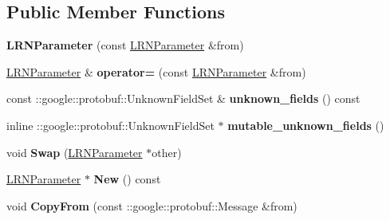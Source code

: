 \subsection*{Public Member Functions}
\begin{DoxyCompactItemize}
\item 
\mbox{\label{classcaffe_1_1_l_r_n_parameter_a51228f8492576cc55ba96e8d19580a26}} 
{\bfseries L\+R\+N\+Parameter} (const \mbox{\hyperlink{classcaffe_1_1_l_r_n_parameter}{L\+R\+N\+Parameter}} \&from)
\item 
\mbox{\label{classcaffe_1_1_l_r_n_parameter_a7126b3d84c9faa653de8981fde98efd2}} 
\mbox{\hyperlink{classcaffe_1_1_l_r_n_parameter}{L\+R\+N\+Parameter}} \& {\bfseries operator=} (const \mbox{\hyperlink{classcaffe_1_1_l_r_n_parameter}{L\+R\+N\+Parameter}} \&from)
\item 
\mbox{\label{classcaffe_1_1_l_r_n_parameter_ac3ba7bac658ae91ea55fa643793effae}} 
const \+::google\+::protobuf\+::\+Unknown\+Field\+Set \& {\bfseries unknown\+\_\+fields} () const
\item 
\mbox{\label{classcaffe_1_1_l_r_n_parameter_a92ad76febb07f8deb47ae706354a661b}} 
inline \+::google\+::protobuf\+::\+Unknown\+Field\+Set $\ast$ {\bfseries mutable\+\_\+unknown\+\_\+fields} ()
\item 
\mbox{\label{classcaffe_1_1_l_r_n_parameter_af36f6e9ee5492cecb4d5256ed03058fa}} 
void {\bfseries Swap} (\mbox{\hyperlink{classcaffe_1_1_l_r_n_parameter}{L\+R\+N\+Parameter}} $\ast$other)
\item 
\mbox{\label{classcaffe_1_1_l_r_n_parameter_a331707ac867aa8a7f6bf6cae775cdce8}} 
\mbox{\hyperlink{classcaffe_1_1_l_r_n_parameter}{L\+R\+N\+Parameter}} $\ast$ {\bfseries New} () const
\item 
\mbox{\label{classcaffe_1_1_l_r_n_parameter_ad26b983fe4d4aaf8e3389cb8b1237542}} 
void {\bfseries Copy\+From} (const \+::google\+::protobuf\+::\+Message \&from)
\item 
\mbox{\label{classcaffe_1_1_l_r_n_parameter_af6a640fcc3b3b7baf8274040fad58307}} 

\end{DoxyCompactItemize}
